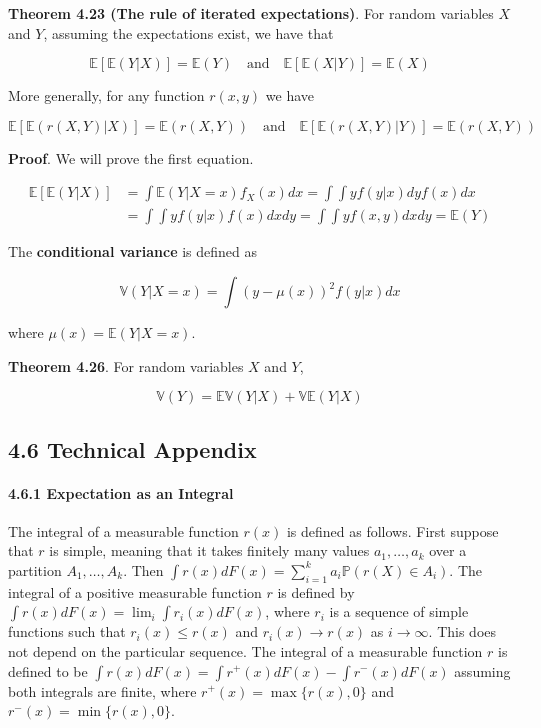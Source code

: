 \textbf{Theorem 4.23 (The rule of iterated expectations)}. For random
variables \(X\) and \(Y\), assuming the expectations exist, we have that

\[ \mathbb{E}[\mathbb{E}(Y | X)] = \mathbb{E}(Y)
\quad \text{and} \quad
\mathbb{E}[\mathbb{E}(X | Y)] = \mathbb{E}(X) \]

More generally, for any function \(r(x, y)\) we have

\[ \mathbb{E}[\mathbb{E}(r(X, Y) | X)] = \mathbb{E}(r(X, Y))
\quad \text{and} \quad
\mathbb{E}[\mathbb{E}(r(X, Y) | Y)] = \mathbb{E}(r(X, Y)) \]

\textbf{Proof}. We will prove the first equation.

\begin{align*}
\mathbb{E}[\mathbb{E}(Y | X)] &= \int \mathbb{E}(Y | X = x) f_X(x) dx = \int \int y f(y | x) dy f(x) dx \\
&= \int \int y f(y|x) f(x) dx dy = \int \int y f(x, y) dx dy = \mathbb{E}(Y)
\end{align*}

The \textbf{conditional variance} is defined as

\[ \mathbb{V}(Y | X = x) = \int (y - \mu(x))^{2} f(y | x) dx \]

where \(\mu(x) = \mathbb{E}(Y | X = x)\).

\textbf{Theorem 4.26}. For random variables \(X\) and \(Y\),

\[ \mathbb{V}(Y) = \mathbb{E}\mathbb{V}(Y | X) + \mathbb{V} \mathbb{E} (Y | X)\]

\subsection*{4.6 Technical Appendix}

\paragraph{4.6.1 Expectation as an
Integral}\label{expectation-as-an-integral}

The integral of a measurable function \(r(x)\) is defined as follows.
First suppose that \(r\) is simple, meaning that it takes finitely many
values \(a_{1}, \dots, a_{k}\) over a partition \(A_{1}, \dots, A_{k}\). Then
\(\int r(x) dF(x) = \sum_{i=1}^{k} a_{i} \mathbb{P}(r(X) \in A_{i})\). The
integral of a positive measurable function \(r\) is defined by
\(\int r(x) dF(x) = \lim_{i} \int r_{i}(x) dF(x)\), where \(r_{i}\) is a
sequence of simple functions such that \(r_{i}(x) \leq r(x)\) and
\(r_{i}(x) \rightarrow r(x)\) as \(i \rightarrow \infty\). This does not
depend on the particular sequence. The integral of a measurable function
\(r\) is defined to be
\(\int r(x) dF(x) = \int r^+(x) dF(x) - \int r^-(x) dF(x)\) assuming
both integrals are finite, where \(r^+(x) = \max \{ r(x), 0 \}\) and
\(r^-(x) = \min\{ r(x), 0 \}\).

